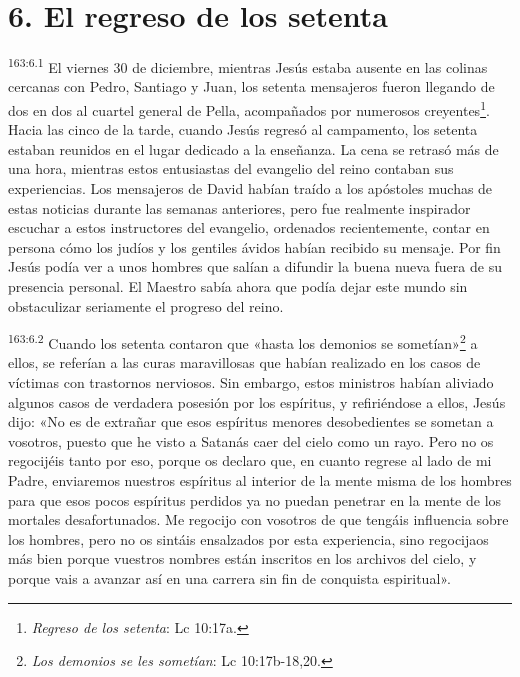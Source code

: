 \section*{6. El regreso de los setenta}
\par
\textsuperscript{163:6.1} El viernes 30 de diciembre, mientras Jesús estaba ausente en las colinas cercanas con Pedro, Santiago y Juan, los setenta mensajeros fueron llegando de dos en dos al cuartel general de Pella, acompañados por numerosos creyentes\footnote{\textit{Regreso de los setenta}: Lc 10:17a.}. Hacia las cinco de la tarde, cuando Jesús regresó al campamento, los setenta estaban reunidos en el lugar dedicado a la enseñanza. La cena se retrasó más de una hora, mientras estos entusiastas del evangelio del reino contaban sus experiencias. Los mensajeros de David habían traído a los apóstoles muchas de estas noticias durante las semanas anteriores, pero fue realmente inspirador escuchar a estos instructores del evangelio, ordenados recientemente, contar en persona cómo los judíos y los gentiles ávidos habían recibido su mensaje. Por fin Jesús podía ver a unos hombres que salían a difundir la buena nueva fuera de su presencia personal. El Maestro sabía ahora que podía dejar este mundo sin obstaculizar seriamente el progreso del reino.

\par
\textsuperscript{163:6.2} Cuando los setenta contaron que «hasta los demonios se sometían»\footnote{\textit{Los demonios se les sometían}: Lc 10:17b-18,20.} a ellos, se referían a las curas maravillosas que habían realizado en los casos de víctimas con trastornos nerviosos. Sin embargo, estos ministros habían aliviado algunos casos de verdadera posesión por los espíritus, y refiriéndose a ellos, Jesús dijo: «No es de extrañar que esos espíritus menores desobedientes se sometan a vosotros, puesto que he visto a Satanás caer del cielo como un rayo. Pero no os regocijéis tanto por eso, porque os declaro que, en cuanto regrese al lado de mi Padre, enviaremos nuestros espíritus al interior de la mente misma de los hombres para que esos pocos espíritus perdidos ya no puedan penetrar en la mente de los mortales desafortunados. Me regocijo con vosotros de que tengáis influencia sobre los hombres, pero no os sintáis ensalzados por esta experiencia, sino regocijaos más bien porque vuestros nombres están inscritos en los archivos del cielo, y porque vais a avanzar así en una carrera sin fin de conquista espiritual».

